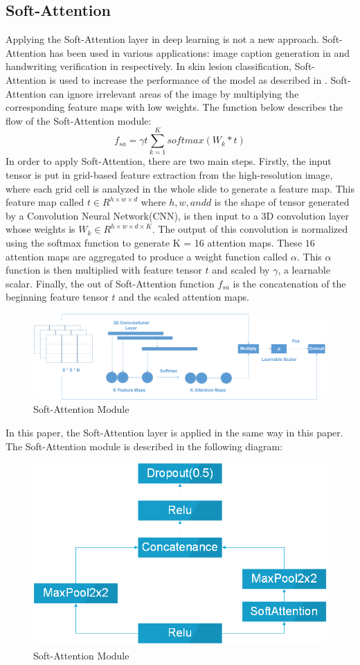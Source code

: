 \subsection{Soft-Attention}
Applying the Soft-Attention layer in deep learning is not a new approach. Soft-Attention has been used in various applications: image caption generation in \cite{03044} and handwriting verification in \cite{202017} respectively. In skin lesion classification, Soft-Attention is used to increase the performance of the model as described in \cite{03358}. Soft-Attention can ignore irrelevant areas of the image by multiplying the corresponding feature maps with low weights. The function below describes the flow of the Soft-Attention module:
\[
f_{sa} = \gamma t\sum_{k=1}^{K}softmax(W_k * t)
\]
In order to apply Soft-Attention, there are two main steps. Firstly, the input tensor is put in grid-based feature extraction from the high-resolution image, where each grid cell is analyzed in the whole slide to generate a feature map\cite{08513}. This feature map called $t \in R^{h \times w \times d}$ where $h, w, and d$ is the shape of tensor generated by a Convolution Neural Network(CNN), is then input to a 3D convolution layer whose weights is $W_k \in R^{h \times w \times d \times K}$. The output of this convolution is normalized using the softmax function to generate K = 16 attention maps. These $16$ attention maps are aggregated to produce a weight function called $\alpha$. This $\alpha$ function is then multiplied with feature tensor $t$ and scaled by $\gamma$, a learnable scalar. Finally, the out of Soft-Attention function $f_{sa}$ is the concatenation of the beginning feature tensor $t$ and the scaled attention maps. 
\begin{figure}
	\centering
	\includegraphics[width=1\linewidth]{Diagram/SoftAttention}
	\caption{Soft-Attention Module}
	\label{fig:softattention}
\end{figure}
In this paper, the Soft-Attention layer is applied in the same way in this paper\cite{03358}. The Soft-Attention module is described in the following diagram:
\begin{figure}[h]
	\centering
	\includegraphics[width=0.5\linewidth]{Diagram/SoftAttentionBlock}
	\caption{Soft-Attention Module}
	\label{fig:softattentionblock}
\end{figure}\\


